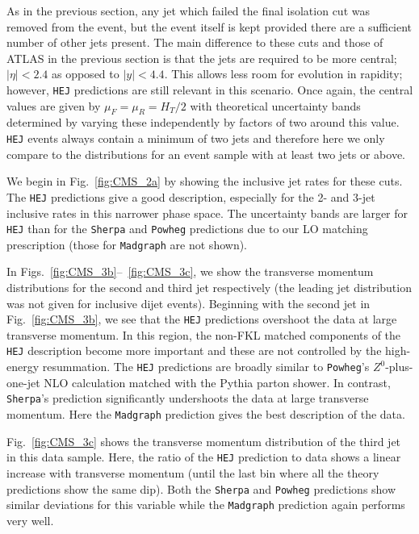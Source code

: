 		As in the previous section, any jet which failed the final isolation cut was
		removed from the event, but the event itself is kept provided there are a
		sufficient number of other jets present.  The main difference to these cuts and
		those of ATLAS in the previous section is that the jets are required to be more
		central; $|\eta|<2.4$ as opposed to $|y|<4.4$.  This allows less room for
		evolution in rapidity; however, \texttt{HEJ} predictions are still relevant in this
		scenario.  Once again, the central values are given by $\mu_F=\mu_R=H_T/2$ with
		theoretical uncertainty bands determined by varying these independently by
		factors of two around this value.  \texttt{HEJ} events always contain a minimum of two
		jets and therefore here we only compare to the distributions for an event sample
		with at least two jets or above.

		We begin in Fig.~\eqref{fig:CMS_2a} by showing the inclusive jet rates for these
		cuts.  The \texttt{HEJ} predictions give a good description, especially for the 2- and
		3-jet inclusive rates in this narrower phase space. The uncertainty bands are
		larger for \texttt{HEJ} than for the \texttt{Sherpa} and \texttt{Powheg} predictions
		due to our LO matching prescription (those for \texttt{Madgraph} are not shown).

		In Figs.~\eqref{fig:CMS_3b}--~\eqref{fig:CMS_3c}, we show the transverse momentum
		distributions for the second and third jet respectively (the leading jet
		distribution was not given for inclusive dijet events).  Beginning with the
		second jet in Fig.~\eqref{fig:CMS_3b}, we see that the \texttt{HEJ} predictions overshoot
		the data at large transverse momentum.  In this region, the non-FKL matched
		components of the \texttt{HEJ} description become more important and these are not
		controlled by the high-energy resummation.  The \texttt{HEJ} predictions are broadly
		similar to \texttt{Powheg}'s $Z^0$-plus-one-jet NLO calculation matched with the Pythia
		parton shower.  In contrast, \texttt{Sherpa}'s prediction significantly undershoots the
		data at large transverse momentum.  Here the \texttt{Madgraph} prediction gives the best
		description of the data.

		Fig.~\eqref{fig:CMS_3c} shows the transverse momentum distribution of the third
		jet in this data sample.  Here, the ratio of the \texttt{HEJ} prediction to data shows a
		linear increase with transverse momentum (until the last bin where all the
		theory predictions show the same dip).  Both the \texttt{Sherpa} and \texttt{Powheg} predictions
		show similar deviations for this variable while the \texttt{Madgraph} prediction again
		performs very well.

